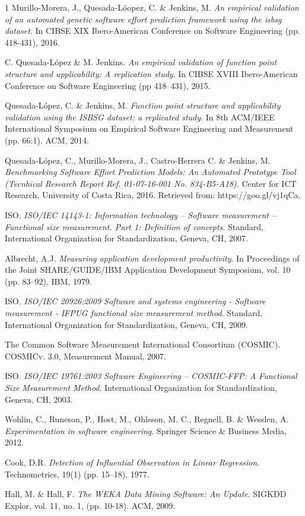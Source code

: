 \documentclass[conference]{IEEEtran}
\begin{document}
\begin{thebibliography}{1}
  Murillo-Morera, J., Quesada-L\'oopez, C. \& Jenkins, M. \emph{An empirical validation of an automated genetic software effort prediction framework using the isbsg dataset}. In CIBSE XIX Ibero-American Conference on Software Engineering (pp. 418-431), 2016.

  C. Quesada-L\'opez \& M. Jenkins. \emph{An empirical validation of function point structure and applicability: A replication study}. In CIBSE XVIII Ibero-American Conference on Software Engineering (pp 418–431), 2015.

  Quesada-L\'opez, C. \& Jenkins, M. \emph{Function point structure and applicability validation using the ISBSG dataset: a replicated study}. In 8th ACM/IEEE International Symposium on Empirical Software Engineering and Measurement (pp. 66:1). ACM, 2014.
  
  Quesada-L\'opez, C., Murillo-Morera, J., Castro-Herrera C. \& Jenkins, M. \emph{Benchmarking Software Effort Prediction Models: An Automated Prototype Tool (Tecnhical Research Report Ref. 01-07-16-001 No. 834-B5-A18)}. Center for ICT Research, University of Costa Rica, 2016. Retrieved from: https://goo.gl/vj1qCa.
  
  ISO. \emph{ISO/IEC 14143-1: Information technology – Software measurement – Functional size measurement. Part 1: Definition of concepts}. Standard, International Organization for Standardization, Geneva, CH, 2007.  
  
  Albrecht, A.J. \emph{Measuring application development productivity}. In Proceedings of the Joint SHARE/GUIDE/IBM Application Development Symposium, vol. 10 (pp. 83–92), IBM, 1979.

  ISO. \emph{ISO/IEC 20926:2009 Software and systems engineering - Software measurement - IFPUG functional size measurement method}. Standard, International Organization for Standardization, Geneva, CH, 2009. 

  The Common Software Measurement International Consortium (COSMIC). COSMICv. 3.0, Measurement Manual, 2007.

  ISO. \emph{ISO/IEC 19761:2003 Software Engineering – COSMIC-FFP: A Functional Size Measurement Method}. International Organization for Standardization, Geneva, CH, 2003.
  
  Wohlin, C., Runeson, P., Host, M., Ohlsson, M. C., Regnell, B. \& Wesslen, A. \emph{Experimentation in software engineering}. Springer Science \& Business Media, 2012.
  
  Cook, D.R. \emph{Detection of Influential Observation in Linear Regression}. Technometrics, 19(1) (pp. 15–18), 1977.
  
  Hall, M. \& Hall, F. \emph{The WEKA Data Mining Software: An Update}. SIGKDD Explor, vol. 11, no. 1, (pp. 10-18). ACM, 2009.  

\end{thebibliography}

\end{document}

